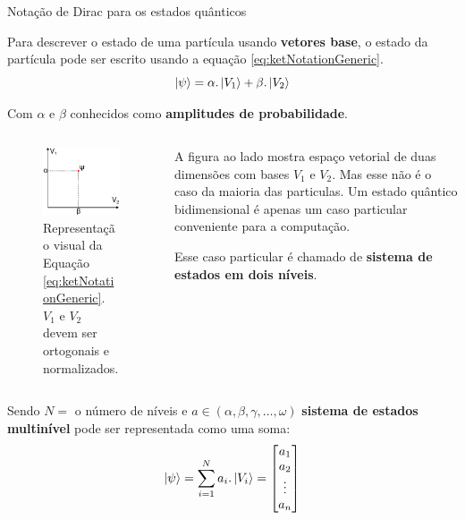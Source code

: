 	\begin{frame}[allowframebreaks]{Notação de Dirac para os estados quânticos}
		\par Para descrever o estado de uma partícula usando \textbf{vetores base}, o estado da partícula pode ser escrito usando a equação \ref{eq:ketNotationGeneric}.
		\begin{equation}
			\ket{\psi} = \alpha . \ket{V_1} + \beta . \ket{V_2}
			\label{eq:ketNotationGeneric}
		\end{equation}
		\par Com $\alpha$ e $\beta$ conhecidos como \textbf{amplitudes de probabilidade}.
		
		\begin{columns}
			\begin{column}{0.5\textwidth}
				\begin{figure}[h]
					\centering
					\includegraphics{../text/images/diracPlot}
					\caption{Representação visual da Equação \ref{eq:ketNotationGeneric}. $V_1$ e $V_2$ devem ser ortogonais e normalizados.}
					\label{fig:diracPlot}
				\end{figure}
			\end{column}
			\begin{column}{0.5\textwidth}
				\par A figura ao lado mostra espaço vetorial de duas dimensões com bases $V_1$ e $V_2$. Mas esse não é o caso da maioria das particulas. Um estado quântico bidimensional é apenas um caso particular conveniente para a computação.\newline
				\par Esse caso particular é chamado de \textbf{sistema de estados em dois níveis}. 
			\end{column}
		\end{columns}
		\par Sendo $N=$ o número de níveis e $a \in (\alpha, \beta, \gamma, \dots , \omega)$ \textbf{sistema de estados multinível} pode ser representada como uma soma:
		\begin{equation}
			\ket{\psi} = \sum_{i=1}^{N} a_i . \ket{V_i}= 
			\begin{bmatrix}
				a_{1} \\
				a_{2} \\
				\vdots \\
				a_{n}
			\end{bmatrix}
			\label{eq:multipleLevelStateSum}
		\end{equation}
	\end{frame}

